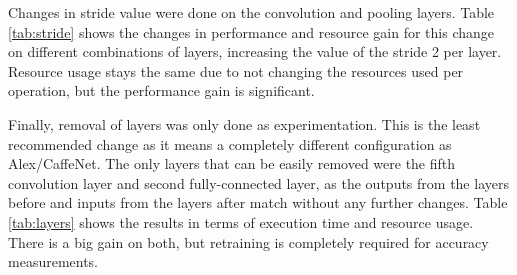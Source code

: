 \begin{enumerate}
Changes in stride value were done on the convolution and pooling layers. Table \ref{tab:stride}
shows the changes in performance and resource gain for this change on different combinations of
layers, increasing the value of the stride 2 per layer. Resource usage stays the same due 
to not changing the resources used per operation, but
the performance gain is significant.

\begin{table}[H]
    \begin{center}
        \caption{Execution time and resource usage for different stride values.}
            \label{tab:stride}
    \end{center}
\end{table}

Finally, removal of layers was only done as experimentation. This is the least recommended change as
it means a completely different configuration as Alex/CaffeNet. The only layers that can
be easily removed were the fifth convolution layer and second fully-connected layer, as the
outputs from the layers before and inputs from the layers after match without any further changes.
Table \ref{tab:layers} shows the results in terms of execution time and resource usage. There is
a big gain on both, but retraining is completely required for accuracy measurements.


\end{enumerate}
